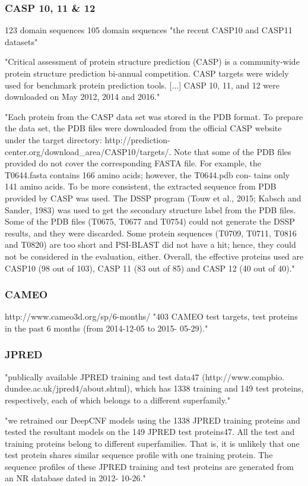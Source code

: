 \documentclass[]{scrartcl}
\begin{document}
\subsubsection{CASP 10, 11 \& 12}
123 domain sequences
105 domain sequences
"the recent CASP10 and CASP11 datasets" \cite{Li2016}

"Critical assessment of protein structure prediction (CASP) is a community-wide protein structure prediction bi-annual competition. CASP targets were widely used for benchmark protein prediction tools. [...] CASP 10, 11, and 12 were downloaded on May 2012, 2014 and 2016." \cite{Fang2017}

"Each protein from the CASP data set was stored in the PDB format. To prepare the data set, the PDB files were downloaded from the official CASP website under the target directory: http://prediction-center.org/download\_area/CASP10/targets/.
Note that some of the PDB files provided do not cover the corresponding FASTA file. For example, the T0644.fasta contains 166 amino acids; however, the T0644.pdb con- tains only 141 amino acids. To be more consistent, the extracted sequence from PDB provided by CASP was used. The DSSP program (Touw et al., 2015; Kabsch and Sander, 1983) was used to get the secondary structure label from the PDB files. Some of the PDB files (T0675, T0677 and T0754) could not generate the DSSP results, and they were discarded. Some protein sequences (T0709, T0711, T0816 and T0820) are too short and PSI-BLAST did not have a hit; hence, they could not be considered in the evaluation, either. Overall, the effective proteins used are CASP10 (98 out of 103), CASP 11 (83 out of 85) and CASP 12 (40 out of 40)." \cite{Fang2017}
\subsubsection{CAMEO}
http://www.cameo3d.org/sp/6-months/
"403 CAMEO test targets, test proteins in the past 6 months (from 2014-12-05 to 2015- 05-29)." \cite{Wang2016}
\subsubsection{JPRED}
"publically available JPRED training and test data47 (http://www.compbio. dundee.ac.uk/jpred4/about.shtml), which has 1338 training and 149 test proteins, respectively, each of which belongs to a different superfamily." \cite{Wang2016}

"we retrained our DeepCNF models using the 1338 JPRED training proteins and tested the resultant models on the 149 JPRED test proteins47. All the test and training proteins belong to different superfamilies. That is, it is unlikely that one test protein shares similar sequence profile with one training protein. The sequence profiles of these JPRED training and test proteins are generated from an NR database dated in 2012- 10-26." \cite{Wang2016}
\end{document}
